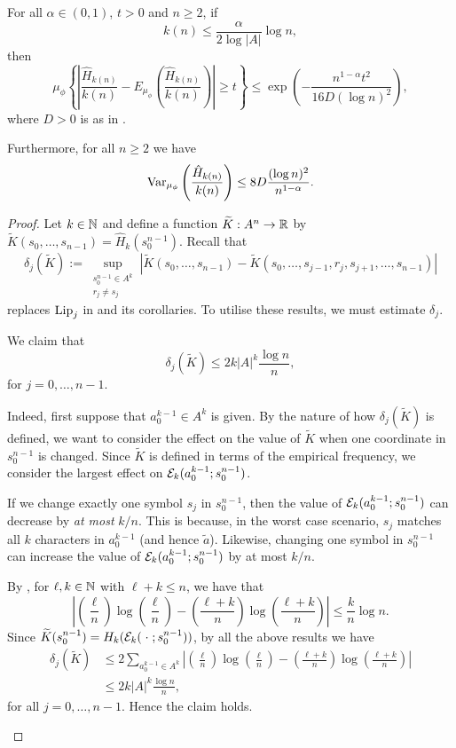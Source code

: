 \begin{theorem}\label{thm:cm-4-1}
	For all $\alpha \in (0, 1)$, $t > 0$ and $n \geq 2$, if
	\[
		k(n) \leq \frac{\alpha}{2 \log{|A|}}\log{n},
	\]
	then
	\[
		\mu_\phi\left\{\left|\frac{\hat{H}_{k(n)}}{k(n)} - E_{\mu_\phi}\left(\frac{\hat{H}_{k(n)}}{k(n)}\right)\right| \geq t\right\} \leq \exp\left(-\frac{n^{1 - \alpha} t^2}{16D(\log{n})^2}\right),
	\]
	where $D > 0$ is as in .
	
	Furthermore, for all $n \geq 2$ we have
	\[
		\operatorname{Var}_{\mu_\phi}\left(\frac{\hat{H}_{k(n)}}{k(n)}\right) \leq 8D\frac{(\log{n})^2}{n^{1 - \alpha}}.
	\]
	\begin{proof}
		Let $k \in \mathbb{N}$ and define a function $\widetilde{K} : A^n \to \mathbb{R}$ by $\tilde{K}(s_0, \dots, s_{n - 1}) = \hat{H}_k(s_0^{n - 1})$. Recall that
		\[
			\delta_j(\tilde{K}) := \sup_{\substack{s_0^{n - 1} \in A^k \\ r_j \neq s_j}}{|\tilde{K}(s_0, \dots, s_{n - 1}) - \tilde{K}(s_0, \dots, s_{j - 1}, r_j, s_{j + 1}, \dots, s_{n - 1})|}
		\]
		replaces $\operatorname{Lip}_j$ in  and its corollaries. To utilise these results, we must estimate $\delta_j$.
		\begin{claim}
			We claim that
			\begin{equation}
				\delta_j(\tilde{K}) \leq 2k|A|^k\frac{\log{n}}{n}, \label{fml:oscil-est}
			\end{equation}
			for $j = 0, \dots, n - 1$.
			
			Indeed, first suppose that $a_0^{k - 1} \in A^k$ is given. By the nature of how $\delta_j(\tilde{K})$ is defined, we want to consider the effect on the value of $\tilde{K}$ when one coordinate in $s_0^{n - 1}$ is changed. Since $\tilde{K}$ is defined in terms of the empirical frequency, we consider the largest effect on $\mathcal{E}_k(a_0^{k - 1}; s_0^{n - 1})$.
			
			If we change exactly one symbol $s_j$ in $s_0^{n - 1}$, then the value of $\mathcal{E}_k(a_0^{k - 1}; s_0^{n - 1})$ can decrease by \emph{at most} $k / n$. This is because, in the worst case scenario, $s_j$ matches all $k$ characters in $a_0^{k - 1}$ (and hence $\tilde{a}$). Likewise, changing one symbol in $s_0^{n - 1}$ can increase the value of $\mathcal{E}_k(a_0^{k - 1}; s_0^{n - 1})$ by at most $k / n$.
			
			By , for $\ell, k \in \mathbb{N}$ with $\ell+ k \leq n$, we have that
			\[
				\left|\left(\frac{\ell}{n}\right)\log\left(\frac{\ell}{n}\right) - \left(\frac{\ell + k}{n}\right)\log\left(\frac{\ell + k}{n}\right)\right| \leq \frac{k}{n}\log{n}.
			\]
			Since $\widetilde{K}(s_0^{n - 1}) = H_k(\mathcal{E}_k(\mathrel{}\cdot\mathrel{}; s_0^{n - 1}))$, by all the above results we have
			\begin{align*}
				\delta_j(\tilde{K}) &\leq 2\sum_{a_0^{k - 1} \in A^k}{\left|\left(\frac{\ell}{n}\right)\log\left(\frac{\ell}{n}\right) - \left(\frac{\ell + k}{n}\right)\log\left(\frac{\ell + k}{n}\right)\right|} \\
				 &\leq 2k|A|^k \frac{\log{n}}{n},
			\end{align*}
			for all $j = 0, \dots, n - 1$. Hence the claim holds.
		\end{claim}
		

\end{proof}
\end{theorem}
